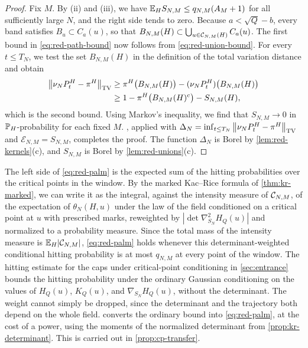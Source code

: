 \begin{proof}
Fix $M$. By (ii) and (iii), we have $\mathbb E_HS_{N,M}\le q_{N,M}(A_M+1)$ for all sufficiently large $N$, and the right side tends to zero. Because $a<\sqrt Q-b$, every band satisfies $B_u\subset C_a(u)$, so that $B_{N,M}(H)\subset\bigcup_{u\in\mathcal C_{N,M}(H)}C_a(u)$. The first bound in \eqref{eq:red-path-bound} now follows from \eqref{eq:red-union-bound}. For every $t\le T_N$, we test the set $B_{N,M}(H)$ in the definition of the total variation distance and obtain
\begin{equation*}
\begin{split}
\left\lVert\nu_NP^H_t-\pi^H\right\rVert_{\mathrm{TV}}&\ge\pi^H\bigl(B_{N,M}(H)\bigr)-(\nu_NP^H_t)\bigl(B_{N,M}(H)\bigr)\\
&\ge1-\pi^H\bigl(B_{N,M}(H)^c\bigr)-S_{N,M}(H),
\end{split}
\end{equation*}
which is the second bound. Using Markov's inequality, we find that $S_{N,M}\to0$ in $\mathbb P_H$-probability for each fixed $M$. , applied with $\Delta_N=\inf_{t\le T_N}\left\lVert\nu_NP^H_t-\pi^H\right\rVert_{\mathrm{TV}}$ and $\mathcal E_{N,M}=S_{N,M}$, completes the proof. The function $\Delta_N$ is Borel by \cref{lem:red-kernels}(c), and $S_{N,M}$ is Borel by \cref{lem:red-unions}(c).
\end{proof}

\begin{remark}\label{rem:red-palm}
The left side of \eqref{eq:red-palm} is the expected sum of the hitting probabilities over the critical points in the window. By the marked Kac--Rice formula of \cref{thm:kr-marked}, we can write it as the integral, against the intensity measure of $\mathcal C_{N,M}$, of the expectation of $\theta_N(H,u)$ under the law of the field conditioned on a critical point at $u$ with prescribed marks, reweighted by $|\det\nabla^2_{S_N}H_Q(u)|$ and normalized to a probability measure. Since the total mass of the intensity measure is $\mathbb E_H|\mathcal C_{N,M}|$, \eqref{eq:red-palm} holds whenever this determinant-weighted conditional hitting probability is at most $q_{N,M}$ at every point of the window. The hitting estimate for the caps under critical-point conditioning in \cref{sec:entrance} bounds the hitting probability under the ordinary Gaussian conditioning on the values of $H_Q(u)$, $K_Q(u)$, and $\nabla_{S_N}H_Q(u)$, without the determinant. The weight cannot simply be dropped, since the determinant and the trajectory both depend on the whole field.  converts the ordinary bound into \eqref{eq:red-palm}, at the cost of a power, using the moments of the normalized determinant from \cref{prop:kr-determinant}. This is carried out in \cref{prop:cp-transfer}.
\end{remark}

